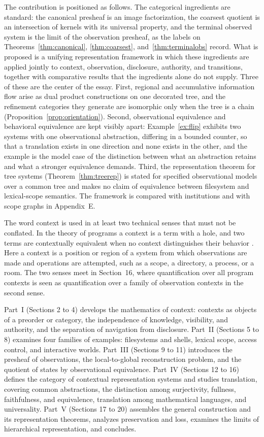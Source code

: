 \documentclass[11pt]{article}
\theoremstyle{definition}
\theoremstyle{remark}
\begin{document}
The contribution is positioned as follows. The categorical ingredients are standard: the canonical presheaf is an image factorization, the coarsest quotient is an intersection of kernels with its universal property, and the terminal observed system is the limit of the observation presheaf, as the labels on Theorems~\ref{thm:canonical}, \ref{thm:coarsest}, and~\ref{thm:terminalobs} record. What is proposed is a unifying representation framework in which these ingredients are applied jointly to context, observation, disclosure, authority, and transitions, together with comparative results that the ingredients alone do not supply. Three of these are the center of the essay. First, regional and accumulative information flow arise as dual product constructions on one decorated tree, and the refinement categories they generate are isomorphic only when the tree is a chain (Proposition~\ref{prop:orientation}). Second, observational equivalence and behavioral equivalence are kept visibly apart: Example~\ref{ex:flip} exhibits two systems with one observational abstraction, differing in a bounded counter, so that a translation exists in one direction and none exists in the other, and the example is the model case of the distinction between what an abstraction retains and what a stronger equivalence demands. Third, the representation theorem for tree systems (Theorem~\ref{thm:treerep}) is stated for specified observational models over a common tree and makes no claim of equivalence between filesystem and lexical-scope semantics. The framework is compared with institutions and with scope graphs in Appendix~E.

The word context is used in at least two technical senses that must not be conflated. In the theory of programs a context is a term with a hole, and two terms are contextually equivalent when no context distinguishes their behavior \cite{morris}. Here a context is a position or region of a system from which observations are made and operations are attempted, such as a scope, a directory, a process, or a room. The two senses meet in Section~16, where quantification over all program contexts is seen as quantification over a family of observation contexts in the second sense.

Part~I (Sections 2 to 4) develops the mathematics of context: contexts as objects of a preorder or category, the independence of knowledge, visibility, and authority, and the separation of navigation from disclosure. Part~II (Sections 5 to 8) examines four families of examples: filesystems and shells, lexical scope, access control, and interactive worlds. Part~III (Sections 9 to 11) introduces the presheaf of observations, the local-to-global reconstruction problem, and the quotient of states by observational equivalence. Part~IV (Sections 12 to 16) defines the category of contextual representation systems and studies translation, covering common abstractions, the distinction among surjectivity, fullness, faithfulness, and equivalence, translation among mathematical languages, and universality. Part~V (Sections 17 to 20) assembles the general construction and its representation theorems, analyzes preservation and loss, examines the limits of hierarchical representation, and concludes.
\end{document}
